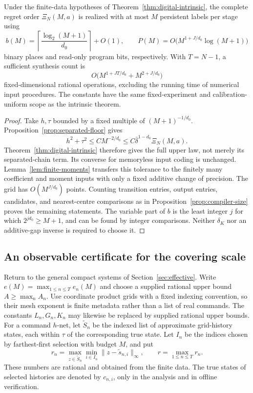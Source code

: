 \begin{corollary}
\label{cor:uniform-resources}
Under the finite-data hypotheses of Theorem~\ref{thm:digital-intrinsic},
the complete regret order $\Xi_N(M,a)$ is realized with at most $M$
persistent labels per stage using
\begin{equation}\label{eq:uniform-resources}
 b(M)=\left\lceil\frac{\log_2(M+1)}{d_0}\right\rceil+O(1),
 \qquad
 P(M)=O\bigl(M^{1+J/d_0}\log(M+1)\bigr)
\end{equation}
binary places and read-only program bits, respectively. With $T=N-1$,
a sufficient synthesis count is
\[
 O\bigl(M^{1+JT/d_0}+M^{2+J/d_0}\bigr)
\]
fixed-dimensional rational operations, excluding the running time of
numerical input procedures. The constants have the same fixed-experiment
and calibration-uniform scope as the intrinsic theorem.
\end{corollary}
\begin{proof}
Take $h,\tau$ bounded by a fixed multiple of $(M+1)^{-1/d_0}$.
Proposition~\ref{prop:separated-floor} gives
\[
 h^2+\tau^2\le C M^{-2/d_0}
              \le C\bar\delta^{1-d_0}\Xi_N(M,a).
\]
Theorem~\ref{thm:digital-intrinsic} therefore gives the full upper
law, not merely its separated-chain term. Its converse for memoryless
input coding is unchanged. Lemma~\ref{lem:finite-moments} transfers
this tolerance to the finitely many coefficient and moment inputs with
only a fixed additive change of precision. The grid has
$O(M^{J/d_0})$ points. Counting transition entries, output entries,
candidates, and nearest-centre comparisons as in
Proposition~\ref{prop:compiler-size} proves the remaining statements.
The variable part of $b$ is the least integer $j$ for which
$2^{j d_0}\ge M+1$, and can be found by integer comparisons. Neither
$\delta_K$ nor an additive-gap inverse is required to choose it.
\end{proof}

\subsection{An observable certificate for the covering scale}
Return to the general compact systems of Section~\ref{sec:effective}.
Write $e(M)=\max_{1\le n\le T}e_n(M)$ and choose a supplied rational
upper bound $A\ge\max_n A_n$. Use coordinate product grids with a fixed indexing convention, so their
mesh exponent is finite metadata rather than a list of real commands.
The constants $L_n,G_n,K_n$ may likewise
be replaced by supplied rational upper bounds. For a command $h$-net,
let $\widetilde S_n$ be the indexed list of approximate grid-history
states, each within $\tau$ of the corresponding true state. Let $I_n$
be the indices chosen by farthest-first selection with budget $M$, and
put
\begin{equation}\label{eq:observable-radius}
 r_n=\max_{z\in\widetilde S_n}\min_{i\in I_n}
                   \|z-\widetilde s_{n,i}\|_\infty,
 \qquad r=\max_{1\le n\le T}r_n.
\end{equation}
These numbers are rational and obtained from the finite data. The true
states of selected histories are denoted by $c_{n,i}$, only in the
analysis and in offline verification.

